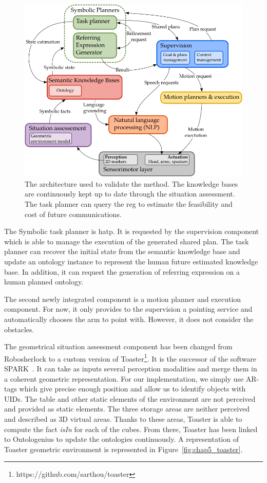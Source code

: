 \begin{figure}[!ht]
\centering
\includegraphics[scale=0.6]{figures/chapter5/architecture.png}
\caption{\label{fig:chap5_archi} The architecture used to validate the method. The knowledge bases are continuously kept up to date through the situation assessment. The task planner can query the \acrshort{reg} to estimate the feasibility and cost of future communications. }
\end{figure}

The Symbolic task planner is \acrshort{hatp}. It is requested by the supervision component which is able to manage the execution of the generated shared plan. The task planner can recover the initial state from the semantic knowledge base and update an ontology instance to represent the human future estimated knowledge base. In addition, it can request the generation of referring expression on a human planned ontology.

The second newly integrated component is a motion planner and execution component. For now, it only provides to the supervision a pointing service and automatically chooses the arm to point with. However, it does not consider the obstacles.

The geometrical situation assessment component has been changed from Robosherlock to a custom version of Toaster\footnote{https://github.com/sarthou/toaster}. It is the successor of the software SPARK~\cite{milliez_2014_framework}. It can take as inputs several perception modalities and merge them in a coherent geometric representation. For our implementation, we simply use AR-tags which give precise enough position and allow us to identify objects with UIDs. The table and other static elements of the environment are not perceived and provided as static elements. The three storage areas are neither perceived and described as 3D virtual areas. Thanks to these areas, Toaster is able to compute the fact \textit{isIn} for each of the cubes. From there, Toaster has been linked to Ontologenius to update the ontologies continuously. A representation of Toaster geometric environment is represented in Figure~\ref{fig:chap5_toaster}.

